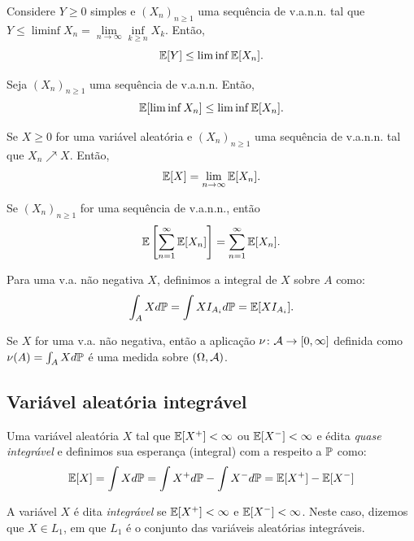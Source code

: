 \begin{lemma}
	Considere $Y\geq0$ simples e $(X_n)_{n\geq1}$ uma sequência de v.a.n.n. tal que $Y\leq\liminf X_n = \lim\limits_{n\to\infty}\inf\limits_{k\geq n}X_k$. Então,
	 \[
	 	\E[Y] \leq \liminf \E[X_n].
	 \]
\end{lemma}

\begin{theorem}
	Seja $(X_n)_{n\geq1}$ uma sequência de v.a.n.n. Então,
	\[
		\E[\liminf X_n] \leq \liminf\E[X_n].
	\]
\end{theorem}

\begin{theorem}
	Se $X\geq0$ for uma variável aleatória e $(X_n)_{n\geq1}$ uma sequência de v.a.n.n. tal que \(X_n\nearrow X\). Então,
	\[
		\E[X] = \lim\limits_{n\to\infty}\E[X_n].
	\]
\end{theorem}

\begin{corollary}
	Se $(X_n)_{n\geq1}$ for uma sequência de v.a.n.n., então
	\[
		\E \left[ \sum_{n=1}^{\infty}\E[X_n] \right] = \sum_{n=1}^{\infty}\E[X_n].
	\]
\end{corollary}

\begin{definition}
	Para uma v.a. não negativa $X$, definimos a integral de $X$ sobre $A$ como:
	\begin{equation}
		\int_A X d\P = \int X I_{A_i}d\P = \E[X I_{A_i}].
	\end{equation}
\end{definition}

\begin{theorem}
	Se $X$ for uma v.a. não negativa, então a aplicação \(\mathmbox{\nu\colon \Acal \to [0, \infty]}\) definida como \(\nu(A) = \int_A X d\P\) é uma medida sobre $(\Omega, \Acal)$.
\end{theorem}

\subsection{Variável aleatória integrável}

\begin{definition}
	Uma variável aleatória $X$ tal que $\E[X^+]<\infty$ ou $\E[X^-]<\infty$ e édita \textit{quase integrável} e definimos sua esperança (integral) com a respeito a $\P$ como:
	\begin{equation}
		\E[X] = \int X d\P = \int X^+ d\P - \int X^- d\P = \E[X^+]-\E[X^-]
	\end{equation}
\end{definition}
	A variável $X$ é dita \textit{integrável} se $\E[X^+]<\infty$ e $\E[X^-]<\infty$. Neste caso, dizemos que $X\in L_1$, em que $L_1$ é o conjunto das variáveis aleatórias integráveis.
	
